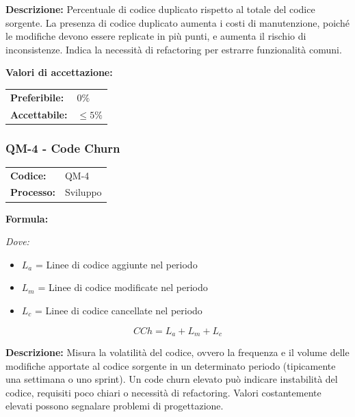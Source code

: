 \documentclass[a4paper,11pt,oneside]{scrartcl}
\begin{document}
\noindent\textbf{Descrizione:} Percentuale di codice duplicato rispetto al totale del codice sorgente. La presenza di codice duplicato aumenta i costi di manutenzione, poiché le modifiche devono essere replicate in più punti, e aumenta il rischio di inconsistenze. Indica la necessità di refactoring per estrarre funzionalità comuni.

\vspace{0.2cm}
\noindent\textbf{Valori di accettazione:}
\vspace{0.1cm}

\noindent
\begin{tabular}{@{}ll@{}}
\textbf{Preferibile:} & $0\%$ \\
\textbf{Accettabile:} & $\le 5\%$ \\
\end{tabular}

\subsubsection{QM-4 - Code Churn}

\noindent
\begin{tabular}{@{}p{}p{}@{}}
\textbf{Codice:} & QM-4 \\
\textbf{Processo:} & Sviluppo \\
\end{tabular}

\vspace{0.3cm}
\noindent\textbf{Formula:}

\noindent\textit{Dove:}
\begin{itemize}[leftmargin=1.5cm, topsep=0pt, itemsep=0pt]
    \item $L_a$ = Linee di codice aggiunte nel periodo
    \item $L_m$ = Linee di codice modificate nel periodo
    \item $L_c$ = Linee di codice cancellate nel periodo
\end{itemize}

\[
CCh = L_a + L_m + L_c
\]

\noindent\textbf{Descrizione:} Misura la volatilità del codice, ovvero la frequenza e il volume delle modifiche apportate al codice sorgente in un determinato periodo (tipicamente una settimana o uno sprint). Un code churn elevato può indicare instabilità del codice, requisiti poco chiari o necessità di refactoring{\scriptsize{}}. Valori costantemente elevati possono segnalare problemi di progettazione.
\end{document}
